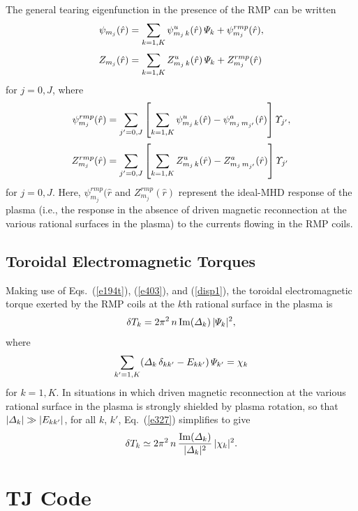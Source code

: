 \documentclass[12pt,prb,aps]{revtex4-1}
\begin{document}
The general tearing eigenfunction in the presence of the RMP can be written
\begin{align}
\psi_{m_j}(\hat{r})&= \sum_{k=1,K}\psi^u_{m_j\,k}(\hat{r})\,{\mit\Psi}_k +\psi_{m_j}^{rmp}(\hat{r}),\\[0.5ex]
Z_{m_j}(\hat{r})&= \sum_{k=1,K}Z^u_{m_j\,k}(\hat{r})\,{\mit\Psi}_k +Z_{m_j}^{rmp}(\hat{r})
\end{align}
for $j=0,J$, where
\begin{align}
\psi^{rmp}_{m_j}(\hat{r}) &= \sum_{j'=0,J}\left[\sum_{k=1,K}\psi_{m_j\,k}^u(\hat{r}) - \psi_{m_j\,m_{j'}}^a(\hat{r})\right]{\mit\Upsilon}_{j'},\\[0.5ex]
Z^{rmp}_{m_j}(\hat{r}) &= \sum_{j'=0,J}\left[\sum_{k=1,K}Z_{m_j\,k}^u(\hat{r}) - Z_{m_j\,m_{j'}}^a(\hat{r})\right]{\mit\Upsilon}_{j'}
\end{align}
for $j=0,J$. 
Here, $\psi^{rmp}_{m_j}(\hat{r}$ and $Z^{rmp}_{m_j}(\hat{r})$ represent the ideal-MHD response of the plasma (i.e., the response in the absence of
driven magnetic reconnection at the various rational surfaces in the plasma)  to the currents flowing in the RMP coils. 

\subsection{Toroidal Electromagnetic Torques}\label{troq}
Making use of Eqs.~(\ref{e194t}), (\ref{e403}), and (\ref{disp1}),  the toroidal electromagnetic torque exerted by the RMP coils at the $k$th rational
surface in the plasma is 
\begin{equation}\label{e327}
\delta T_k = 2\pi^2\,n\,{\rm Im}({\mit\Delta}_k)\,|{\mit\Psi}_k|^2,
\end{equation}
where
\begin{equation}
\sum_{k'=1,K}({\mit\Delta}_k\,\delta_{kk'}-E_{kk'})\,{\mit\Psi}_{k'} = \chi_k
\end{equation}
for $k=1,K$. In situations in which driven magnetic reconnection at the various rational surface in the plasma is
strongly shielded by plasma rotation,\cite{am3,rfa} so that $|{\mit\Delta}_k|\gg |E_{kk'}|$, for all $k$, $k'$, Eq.~(\ref{e327}) simplifies to give
\begin{equation}
\delta T_k\simeq 2\pi^2\,n\,\frac{{\rm Im}({\mit\Delta}_k)}{|{\mit\Delta}_k|^2}\,|{\mit\chi}_k|^2.
\end{equation}

\section{TJ Code}\label{tj}
\end{document}
